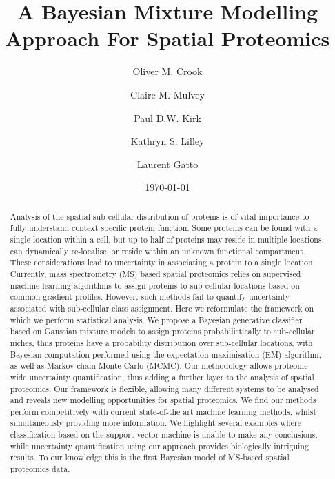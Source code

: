 \documentclass[12pt,english]{article}\usepackage[]{graphicx}\usepackage[]{color}
\begin{document}
\author[1,2,3]{Oliver M. Crook}
\author[2]{Claire M. Mulvey}
\author[3]{Paul D.W. Kirk}
\author[2]{Kathryn S. Lilley}
\author[1,2,4,*]{Laurent Gatto}





\title{A Bayesian Mixture Modelling Approach For Spatial Proteomics}

\date{\small \today}

\maketitle
\linenumbers
\begin{abstract}
  Analysis of the spatial sub-cellular distribution of proteins is of
  vital importance to fully understand context specific protein
  function. Some proteins can be found with a single location within a
  cell, but up to half of proteins may reside in multiple locations,
  can dynamically re-localise, or reside within an unknown functional
  compartment. These considerations lead to uncertainty in associating
  a protein to a single location. Currently, mass spectrometry (MS)
  based spatial proteomics relies on supervised machine learning
  algorithms to assign proteins to sub-cellular locations based on
  common gradient profiles. However, such methods fail to quantify
  uncertainty associated with sub-cellular class assignment. Here we
  reformulate the framework on which we perform statistical
  analysis. We propose a Bayesian generative classifier based on
  Gaussian mixture models to assign proteins probabilistically to
  sub-cellular niches, thus proteins have a probability distribution
  over sub-cellular locations, with Bayesian computation
  performed using the expectation-maximisation (EM) algorithm, as well
  as Markov-chain Monte-Carlo (MCMC). Our methodology allows
  proteome-wide uncertainty quantification, thus adding a further
  layer to the analysis of spatial proteomics. Our framework is
  flexible, allowing many different systems to be analysed and reveals
  new modelling opportunities for spatial proteomics. We find our
  methods perform competitively with current state-of-the art
  machine learning methods, whilst simultaneously providing more
  information. We highlight several examples where classification
  based on the support vector machine is unable to make any
  conclusions, while uncertainty quantification using our approach provides
  biologically intriguing results.  To our knowledge this is the first
  Bayesian model of MS-based spatial proteomics data.
\end{abstract}
\end{document}
